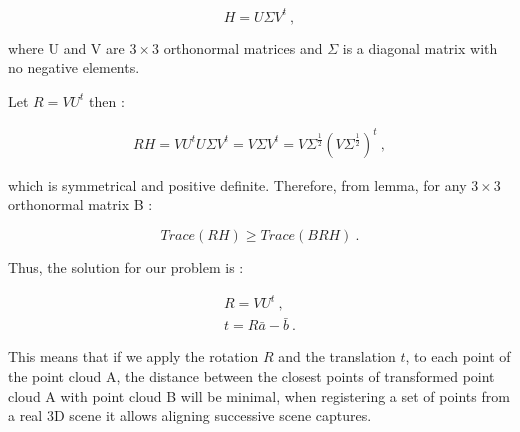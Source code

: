 \[ H = U \Sigma V^t \ , \]

\noindent where U and V are $3\times3$ orthonormal matrices and $\Sigma$ is a diagonal matrix with no negative elements.

Let $ R = V U^t $ then :

\begin{align*}
RH = VU^t U \Sigma V^t = V \Sigma V^t = V \Sigma^{\frac{1}{2}} (V \Sigma^{\frac{1}{2}})^t \ ,
\end{align*}

\noindent which is symmetrical and positive definite.
Therefore, from lemma, for any $3\times3$ orthonormal matrix B :

\[ Trace( R H ) \geq Trace( B R H ) \ . \]

Thus, the solution for our problem is :

\begin{align*}
R = V U^t \ , \\
t = R \bar{a} - \bar{b} \ .
\end{align*}


\noindent This means that if we apply the rotation $R$ and the translation $t$, to each point of the point cloud A, the distance between the
 closest points of 
transformed point cloud A with point cloud B will be minimal, when registering a set of points from a real 3D scene it allows aligning 
successive scene captures.
